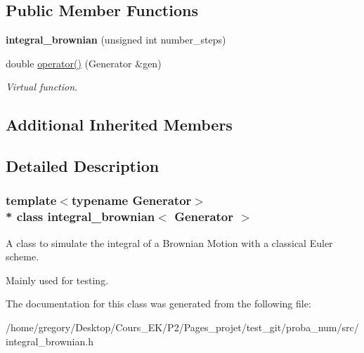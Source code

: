 \subsection*{Public Member Functions}
\begin{DoxyCompactItemize}
\item 
{\bfseries integral\+\_\+brownian} (unsigned int number\+\_\+steps)\hypertarget{classintegral__brownian_acbb676c9fb27ebd1de72f9dda5e2bbbf}{}\label{classintegral__brownian_acbb676c9fb27ebd1de72f9dda5e2bbbf}

\item 
double \hyperlink{classintegral__brownian_a974ec7d678079bc1acdc691a506a3092}{operator()} (Generator \&gen)\hypertarget{classintegral__brownian_a974ec7d678079bc1acdc691a506a3092}{}\label{classintegral__brownian_a974ec7d678079bc1acdc691a506a3092}

\begin{DoxyCompactList}\small\item\em Virtual function. \end{DoxyCompactList}\end{DoxyCompactItemize}
\subsection*{Additional Inherited Members}


\subsection{Detailed Description}
\subsubsection*{template$<$typename Generator$>$\\*
class integral\+\_\+brownian$<$ Generator $>$}

A class to simulate the integral of a Brownian Motion with a classical Euler scheme. 

Mainly used for testing. 

The documentation for this class was generated from the following file\+:\begin{DoxyCompactItemize}
\item 
/home/gregory/\+Desktop/\+Cours\+\_\+\+E\+K/\+P2/\+Pages\+\_\+projet/test\+\_\+git/proba\+\_\+num/src/integral\+\_\+brownian.\+h\end{DoxyCompactItemize}
